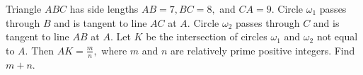 Triangle $ABC$ has side lengths $AB=7, BC=8, $ and $CA=9.$ Circle $\omega_1$ passes through $B$ and is tangent to line $AC$ at $A.$ Circle $\omega_2$ passes through $C$ and is tangent to line $AB$ at $A.$ Let $K$ be the intersection of circles $\omega_1$ and $\omega_2$ not equal to $A.$ Then $AK=\tfrac{m}{n},$ where $m$ and $n$ are relatively prime positive integers. Find $m+n$.